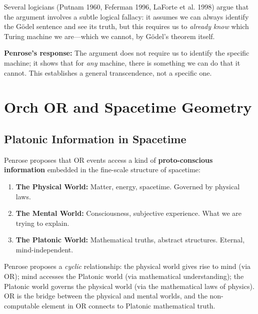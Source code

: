 \documentclass[11pt,a4paper]{report}
\begin{document}
\begin{objbox}
Several logicians (Putnam 1960, Feferman 1996, LaForte et al. 1998) argue that the argument involves a subtle logical fallacy: it assumes we can always identify the G\"odel sentence and see its truth, but this requires us to \emph{already know} which Turing machine we are---which we cannot, by G\"odel's theorem itself.

\textbf{Penrose's response:} The argument does not require us to identify the specific machine; it shows that for \emph{any} machine, there is something we can do that it cannot. This establishes a general transcendence, not a specific one.
\end{objbox}


\chapter{Orch OR and Spacetime Geometry}

\section{Platonic Information in Spacetime}

Penrose proposes that OR events access a kind of \textbf{proto-conscious information} embedded in the fine-scale structure of spacetime:

\begin{principlebox}
\begin{enumerate}[leftmargin=1.5em]
  \item \textbf{The Physical World:} Matter, energy, spacetime. Governed by physical laws.
  \item \textbf{The Mental World:} Consciousness, subjective experience. What we are trying to explain.
  \item \textbf{The Platonic World:} Mathematical truths, abstract structures. Eternal, mind-independent.
\end{enumerate}
Penrose proposes a \emph{cyclic} relationship: the physical world gives rise to mind (via OR); mind accesses the Platonic world (via mathematical understanding); the Platonic world governs the physical world (via the mathematical laws of physics). OR is the bridge between the physical and mental worlds, and the non-computable element in OR connects to Platonic mathematical truth.
\end{principlebox}
\end{document}
